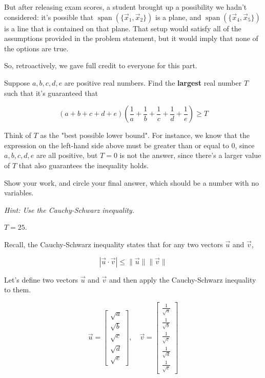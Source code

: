 \documentclass[11pt]{article}
\begin{document}
\begin{prob}
\begin{subprob}
\begin{solution}
But after releasing exam scores, a student brought up a possibility we hadn't considered: it's possible that $\operatorname{span}(\{\vec x_1, \vec x_2\})$ is a plane, and $\operatorname{span}(\{\vec x_4, \vec x_5\})$ is a line that is contained on that plane. That setup would satisfy all of the assumptions provided in the problem statement, but it would imply that none of the options are true.

So, retroactively, we gave full credit to everyone for this part.
\end{solution}

\end{subprob}

\end{prob}

\newpage

\begin{prob}
Suppose $a, b, c, d, e$ are positive real numbers. Find the \textbf{largest} real number $T$ such that it's guaranteed that

$$(a + b + c + d + e) \left( \frac{1}{a} + \frac{1}{b} + \frac{1}{c} + \frac{1}{d} + \frac{1}{e} \right) \geq T$$

Think of $T$ as the "best possible lower bound". For instance, we know that the expression on the left-hand side above must be greater than or equal to 0, since $a, b, c, d, e$ are all positive, but $T = 0$ is not the answer, since there's a larger value of $T$ that also guarantees the inequality holds.

Show your work, and $\boxed{\text{circle}}$ your final answer, which should be a number with no variables.

\textit{Hint: Use the Cauchy-Schwarz inequality.}

\emptybox{15cm}

\begin{solution}
$T = 25$.

Recall, the Cauchy-Schwarz inequality states that for any two vectors $\vec u$ and $\vec v$,

$$|\vec u \cdot \vec v| \leq \lVert \vec u \rVert \lVert \vec v \rVert$$

Let's define two vectors $\vec u$ and $\vec v$ and then apply the Cauchy-Schwarz inequality to them.

$$\vec u = \begin{bmatrix} \sqrt{a} \\ \sqrt{b} \\ \sqrt{c} \\ \sqrt{d} \\ \sqrt{e} \end{bmatrix}, \quad \vec v = \begin{bmatrix} \frac{1}{\sqrt{a}} \\ \frac{1}{\sqrt{b}} \\ \frac{1}{\sqrt{c}} \\ \frac{1}{\sqrt{d}} \\ \frac{1}{\sqrt{e}} \end{bmatrix}$$


\end{solution}
\end{prob}
\end{document}
